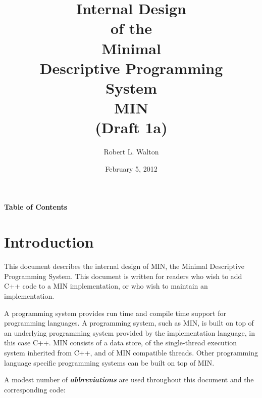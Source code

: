 \documentclass[12pt]{article}
\makeatletter
\renewcommand\tableofcontents{%
    \begin{list}{}%
	     {\setlength{\itemsep}{0in}%
	      \setlength{\topsep}{0in}%
	      \setlength{\parsep}{1ex}%
	      \setlength{\labelwidth}{0in}%
	      \setlength{\baselineskip}{1.5ex}%
	      \setlength{\leftmargin}{0.8in}%
	      \setlength{\rightmargin}{0.8in}}%
    \item\@starttoc{toc}%
    \end{list}}
\newcommand{\skey}[2]{{\bf \em #1#2}\index{#1}}
\makeatother
\begin{document}
        
\title{Internal Design\\[2ex]of the\\[2ex]
       Minimal\\Descriptive Programming\\System\\[2ex]MIN\\[2ex]
       (Draft 1a)}

\author{Robert L. Walton}

\date{February 5, 2012}
 
\maketitle

\newpage
\begin{center}
\large \bf Table of Contents
\end{center}

\bigskip

\tableofcontents 

\newpage

\section{Introduction}

This document describes the internal design of MIN,
the Minimal Descriptive Programming System.
This document is written for readers who wish to add C++ code
to a MIN implementation, or who wish to maintain an implementation.

A programming system provides run time and compile time support
for programming languages.
A programming system, such as MIN, is
built on top of an underlying programming system provided by the
implementation language, in this case C++.
MIN consists of a data store, of the single-thread execution system
inherited from C++, and of MIN compatible threads.
Other programming language specific
programming systems can be built on top of MIN.

A modest number of \skey{abbreviation}s are used throughout this document
and the corresponding code:
\end{document}
